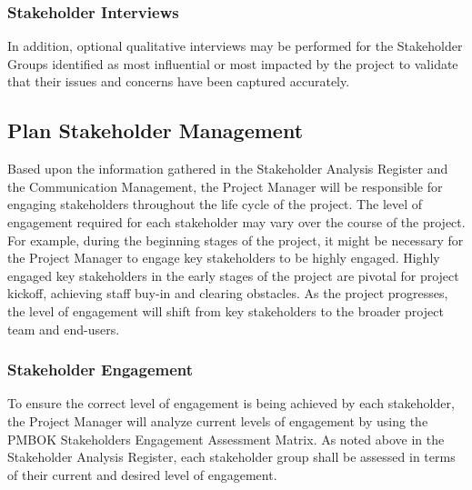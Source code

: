 \subsubsection{Stakeholder Interviews}
In addition, optional qualitative interviews may be performed for the Stakeholder Groups identified as most influential or most impacted by the project to validate that their issues and concerns have been captured accurately.

\newpage

\subsection{Plan Stakeholder Management}
Based upon the information gathered in the Stakeholder Analysis Register and the Communication Management, the Project Manager will be responsible for engaging stakeholders throughout the life cycle of the project. The level of engagement required for each stakeholder may vary over the course of the project. For example, during the beginning stages of the project, it might be necessary for the Project Manager to engage key stakeholders to be highly engaged.  Highly engaged key stakeholders in the early stages of the project are pivotal for project kickoff, achieving staff buy-in and clearing obstacles.  As the project progresses, the level of engagement will shift from key stakeholders to the broader project team and end-users.  

\subsubsection{Stakeholder Engagement}
To ensure the correct level of engagement is being achieved by each stakeholder, the Project Manager will analyze current levels of engagement by using the PMBOK Stakeholders Engagement Assessment Matrix.  As noted above in the Stakeholder Analysis Register, each stakeholder group shall be assessed in terms of their current and desired level of engagement.
 
